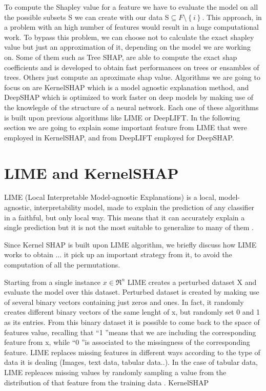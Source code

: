 \documentclass[11pt]{report}
\begin{document}
To compute the Shapley value for a feature we have to evaluate the model on all the possible subsets S we can create with our data S$\subseteq F \setminus \left\{i\right\}$. This approach, in a problem with an high number of features would result in a huge computational work. To bypass this problem, we can choose not to calculate the exact shapley value but just an approximation of it, depending on the model we are working on. Some of them such as Tree SHAP, are able to compute the exact shap coefficients and is developed to obtain fast performances on trees or ensambles of trees.
Others just compute an aproximate shap value. Algorithms we are going to focus on are KernelSHAP which is a model agnostic explanation method, and DeepSHAP which is optimized to work faster on deep models by making use of the knowlegde of the structure of a neural network.
Each one of these algorithms is built upon previous algorithms like LIME or DeepLIFT. In the following section we are going to explain some important feature from LIME that were employed in KernelSHAP, and from DeepLIFT employed for DeepSHAP.

\section{LIME and KernelSHAP}\label{sec:lime}\hfill

LIME (Local Interpretable Model-agnostic Explanations) is a local, model-agnostic, interpretability model, made to explain the prediction of any classifier in a faithful, but only local way. This means that it can accurately explain a single prediction but it is not the most suitable to generalize to many of them \cite{ribeiro-2016}.

Since Kernel SHAP is built upon LIME algorithm, we briefly discuss how LIME works to obtain ...
it pick up an important strategy from it, to avoid the computation of all the permutations.

Starting from a single instance  $x \in \Re^n$  LIME creates a perturbed dataset X and evaluate the model over this dataset.
Perturbed dataset is created by making use of several binary vectors containing just zeros and ones. In fact, it randomly creates different binary vectors of the same lenght of x, but randomly set 0 and 1 as its entries.
From this binary dataset it is possible to come back to the space of features value, recalling that \textquotedblleft 1 \textquotedblright means that we are including the corresponding feature from x, while \textquotedblleft 0 \textquotedblright is associated to the missingness of the corresponding feature.
LIME replaces missing features in different ways according to the type of data it is dealing (Images, text data, tabular data..).
In the case of tabular data, LIME repleaces missing values by randomly sampling a value from the distribution of that feature from the training data  \cite{ferrando2018}.
KernelSHAP
\end{document}

